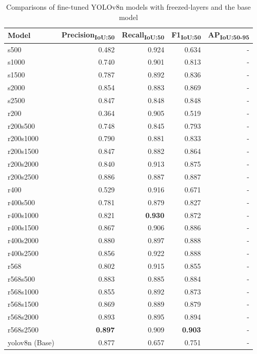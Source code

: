 \begin{table}[ht]
    \begin{tabular}{|l|r|r|r|r|}
    \hline
    Model & Precision\textsubscript{IoU:50} & Recall\textsubscript{IoU:50} & F1\textsubscript{IoU:50} & AP\textsubscript{IoU:50-95} \\
    \hline
    s500 & 0.482 & 0.924 & 0.634 & - \\
    s1000 & 0.740 & 0.901 & 0.813 & - \\
    s1500 & 0.787 & 0.892 & 0.836 & - \\
    s2000 & 0.854 & 0.883 & 0.869 & - \\
    s2500 & 0.847 & 0.848 & 0.848 & - \\
    \hline
    r200 & 0.364 & 0.905 & 0.519 & -\\
    r200s500 & 0.748 & 0.845 & 0.793 & -\\
    r200s1000 & 0.790 & 0.881 & 0.833 & - \\
    r200s1500 & 0.847 & 0.882 & 0.864 & - \\
    r200s2000 & 0.840 & 0.913 & 0.875 & - \\
    r200s2500 & 0.886 & 0.887 & 0.887 & - \\
    \hline
    r400 & 0.529 & 0.916 & 0.671 & - \\
    r400s500 & 0.781 & 0.879 & 0.827 & - \\
    r400s1000 & 0.821 & \textbf{0.930} & 0.872 & -\\
    r400s1500 & 0.867 & 0.906 & 0.886 & - \\
    r400s2000 & 0.880 & 0.897 & 0.888 & - \\
    r400s2500 & 0.856 & 0.922 & 0.888 & - \\
    \hline
    r568 & 0.802 & 0.915 & 0.855 & - \\
    r568s500 & 0.883 & 0.885 & 0.884 & - \\
    r568s1000 & 0.855 & 0.892 & 0.873 & - \\
    r568s1500 & 0.869 & 0.889 & 0.879 & - \\
    r568s2000 & 0.893 & 0.895 & 0.894 & - \\
    r568s2500 & \textbf{0.897} & 0.909 & \textbf{0.903} & - \\
    \hline
    \hline
    yolov8n (Base) & 0.877 & 0.657 & 0.751 & - \\
    \hline
    \end{tabular}
    \caption{Comparisons of fine-tuned YOLOv8n models with freezed-layers and the base model} 
    \label{tab:results}
    \end{table}
    

